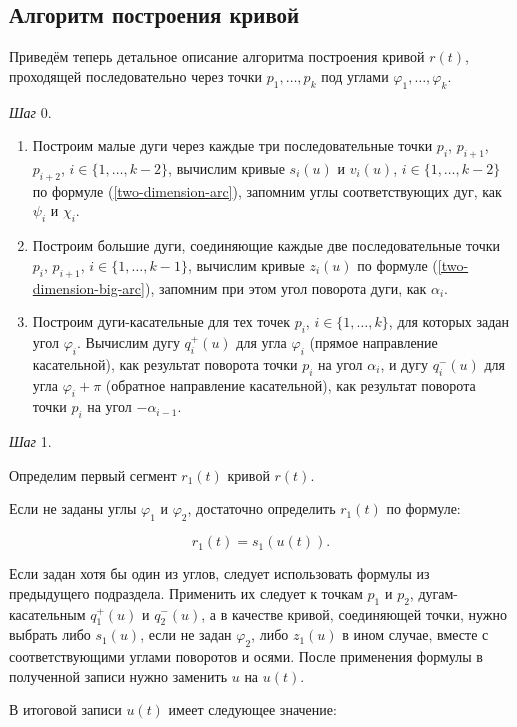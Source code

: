 \subsection*{Алгоритм построения кривой}

Приведём теперь детальное описание алгоритма построения кривой $r(t)$, проходящей последовательно через точки
$p_1,\dots,p_k$ под углами $\varphi_1,\dots,\varphi_k$.

\bigskip
\textit{Шаг} 0.

\begin{enumerate}
\item Построим малые дуги через каждые три последовательные точки $p_i$, $p_{i+1}$, $p_{i+2}$,
$i \in \{1,\dots,k-2\}$, вычислим кривые $s_i(u)$ и $v_i(u)$, $i \in \{1,\dots,k-2\}$ по формуле
(\ref{two-dimension-arc}), запомним углы соответствующих дуг, как $\psi_i$ и $\chi_i$.
\item Построим большие дуги, соединяющие каждые две последовательные точки $p_i$, $p_{i+1}$, $i \in \{1,\dots,k-1\}$,
вычислим кривые $z_i(u)$ по формуле (\ref{two-dimension-big-arc}), запомним при этом угол поворота дуги, как $\alpha_i$.
\item Построим дуги-касательные для тех точек $p_i$, $i \in \{1,\dots,k\}$, для которых задан угол $\varphi_i$.
Вычислим дугу $q_i^+(u)$ для угла $\varphi_i$ (прямое направление касательной), как результат поворота точки $p_i$
на угол $\alpha_i$, и дугу $q_i^-(u)$ для угла $\varphi_i+\pi$ (обратное направление касательной), как результат поворота
точки $p_i$ на угол $-\alpha_{i-1}$.
\end{enumerate}

\bigskip
\textit{Шаг} 1.

Определим первый сегмент $r_1(t)$ кривой $r(t)$.

Если не заданы углы $\varphi_1$ и $\varphi_2$, достаточно определить $r_1(t)$ по формуле:

$$
r_1(t)=s_1(u(t)).
$$

Если задан хотя бы один из углов, следует использовать формулы из предыдущего подраздела. Применить их следует к
точкам $p_1$ и $p_2$, дугам-касательным $q_1^+(u)$ и $q_2^-(u)$, а в качестве кривой, соединяющей точки, нужно
выбрать либо $s_1(u)$, если не задан $\varphi_2$, либо $z_1(u)$ в ином случае, вместе с соответствующими углами
поворотов и осями. После применения формулы в полученной записи нужно заменить $u$ на $u(t)$.

В итоговой записи $u(t)$ имеет следующее значение:

